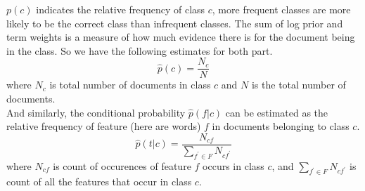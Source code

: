 \documentclass{article}
\begin{document}
\begin{enumerate}[a.]
{    $p(c)$ indicates the relative frequency of class $c$, more
    frequent classes are more likely to be the correct class than
    infrequent classes. The sum of log prior and term weights is a
    measure of how much evidence there is for the document being in
    the class. So we have the following estimates for both part. 
    \[ \hat{p}(c)=\frac{N_c}{N} \]
    where $N_c$ is total number of documents in class $c$ and $N$ is
    the total number of documents. \\ 
    And similarly, the conditional probability $\hat{p}(f|c)$ can be
    estimated as the relative frequency of feature (here are words)
    $f$ in documents belonging to class $c$. 
    \[ \hat{p}(t|c)=\frac{N_{cf}}{\sum_{f^{\prime}\in F}N_{cf^{\prime}}} \]
    where $N_{cf}$ is count of occurences of feature $f$ occurs in
    class $c$, and $\sum_{f^{\prime}\in F}N_{cf^{\prime}}$ is count of all the
    features that occur in class $c$. 

}
\end{enumerate}
\end{document}
